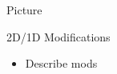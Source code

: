 
\begin{frame}
    
Picture

\end{frame}


\begin{frame}[t]{2D/1D Modifications}
    
    \begin{itemize}
        \item Describe mods
    \end{itemize}

\end{frame}